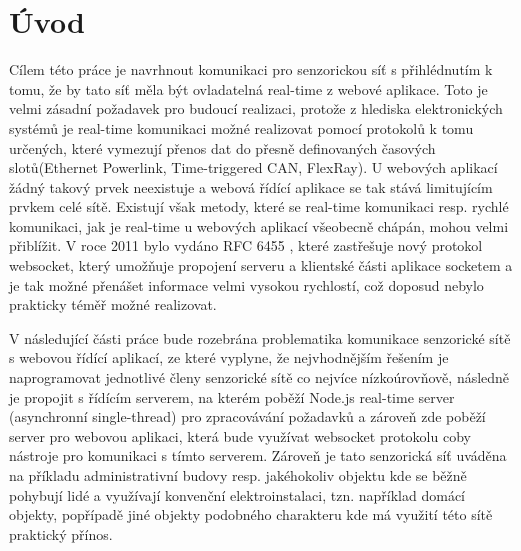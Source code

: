 \chapter{Úvod}
Cílem této práce je navrhnout komunikaci pro senzorickou síť s přihlédnutím k tomu, že by tato síť měla být ovladatelná real-time z webové aplikace. Toto je velmi zásadní požadavek pro budoucí realizaci, protože z hlediska elektronických systémů je real-time komunikaci možné realizovat pomocí protokolů k tomu určených, které vymezují přenos dat do přesně definovaných časových slotů(Ethernet Powerlink, Time-triggered CAN, FlexRay). U webových aplikací žádný takový prvek neexistuje a webová řídící aplikace se tak stává limitujícím prvkem celé sítě. Existují však metody, které se real-time komunikaci resp. rychlé komunikaci, jak je real-time u webových aplikací všeobecně chápán, mohou velmi přiblížit. V roce 2011 bylo vydáno RFC 6455 \cite{rfc6455}, které zastřešuje nový protokol websocket, který umožňuje propojení serveru a klientské části aplikace socketem a je tak možné přenášet informace velmi vysokou rychlostí, což doposud nebylo prakticky téměř možné realizovat.

V následující části práce bude rozebrána problematika komunikace senzorické sítě s webovou řídící aplikací, ze které vyplyne, že nejvhodnějším řešením je naprogramovat jednotlivé členy senzorické sítě co nejvíce ní\-zko\-ú\-rov\-ňo\-vě, následně je propojit s řídícím serverem, na kterém poběží Node.js real-time server (asynchronní single-thread) pro zpracovávání požadavků a zároveň zde poběží server pro webovou aplikaci, která bude využívat websocket protokolu coby nástroje pro komunikaci s tímto serverem. Zároveň je tato senzorická síť uváděna na příkladu administrativní budovy resp. jakéhokoliv objektu kde se běžně pohybují lidé a využívají konvenční elektroinstalaci, tzn. například domácí objekty, popřípadě jiné objekty podobného charakteru kde má využití této sítě praktický přínos.